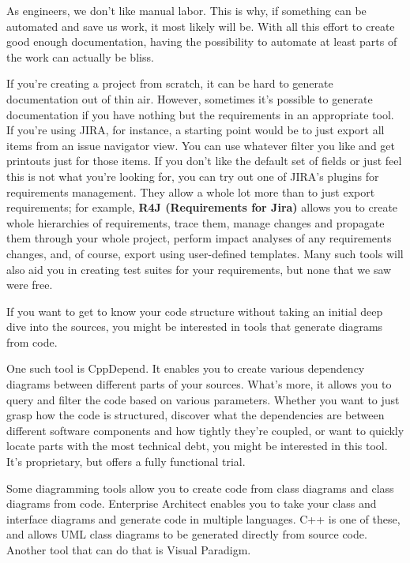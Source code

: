 
As engineers, we don't like manual labor. This is why, if something can be automated and save us work, it most likely will be. With all this effort to create good enough documentation, having the possibility to automate at least parts of the work can actually be bliss.


If you're creating a project from scratch, it can be hard to generate documentation out of thin air. However, sometimes it's possible to generate documentation if you have nothing but the requirements in an appropriate tool. If you're using JIRA, for instance, a starting point would be to just export all items from an issue navigator view. You can use whatever filter you like and get printouts just for those items. If you don't like the default set of fields or just feel this is not what you're looking for, you can try out one of JIRA's plugins for requirements management. They allow a whole lot more than to just export requirements; for example, \textbf{R4J (Requirements for Jira)} allows you to create whole hierarchies of requirements, trace them, manage changes and propagate them through your whole project, perform impact analyses of any requirements changes, and, of course, export using user-defined templates. Many such tools will also aid you in creating test suites for your requirements, but none that we saw were free.




If you want to get to know your code structure without taking an initial deep dive into the sources, you might be interested in tools that generate diagrams from code.

One such tool is CppDepend. It enables you to create various dependency diagrams between different parts of your sources. What's more, it allows you to query and filter the code based on various parameters. Whether you want to just grasp how the code is structured, discover what the dependencies are between different software components and how tightly they're coupled, or want to quickly locate parts with the most technical debt, you might be interested in this tool. It's proprietary, but offers a fully functional trial.

Some diagramming tools allow you to create code from class diagrams and class diagrams from code. Enterprise Architect enables you to take your class and interface diagrams and generate code in multiple languages. C++ is one of these, and allows UML class diagrams to be generated directly from source code. Another tool that can do that is Visual Paradigm.


